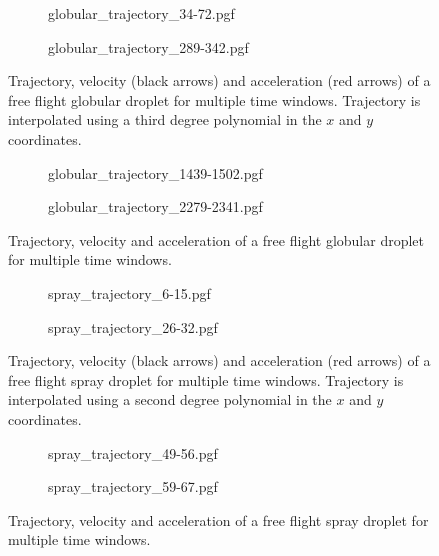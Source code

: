 \begin{figure}
\centering
  \begin{subfigure}[b]{.8\textwidth}
    {globular_trajectory_34-72.pgf}
  \end{subfigure}
\vfill
  \begin{subfigure}[b]{.8\textwidth}
    {globular_trajectory_289-342.pgf}
  \end{subfigure}
\caption[Trajectory, velocity and acceleration of a free flight globular droplet for multiple time windows]{Trajectory, velocity (black arrows) and acceleration (red arrows) of a free flight globular droplet for multiple time windows. Trajectory is interpolated using a third degree polynomial in the $x$ and $y$ coordinates.} 
\label{fig:vel_glob}
\end{figure}

\begin{figure}
\centering
    \ContinuedFloat
    \captionsetup{list=off,format=cont}
  \begin{subfigure}[b]{.8\textwidth}
    {globular_trajectory_1439-1502.pgf}
  \end{subfigure}
\vfill
  \begin{subfigure}[b]{.8\textwidth}
    {globular_trajectory_2279-2341.pgf}
  \end{subfigure}
\caption{Trajectory, velocity and acceleration of a free flight globular droplet for multiple time windows.} 
\end{figure}

\begin{figure}
\centering
  \begin{subfigure}[b]{.8\textwidth}
    {spray_trajectory_6-15.pgf}
  \end{subfigure}
\vfill
  \begin{subfigure}[b]{.8\textwidth}
    {spray_trajectory_26-32.pgf}
  \end{subfigure}
\caption[Trajectory, velocity and acceleration of a free flight spray droplet for multiple time windows]{Trajectory, velocity (black arrows) and acceleration (red arrows) of a free flight spray droplet for multiple time windows. Trajectory is interpolated using a second degree polynomial in the $x$ and $y$ coordinates.} 
\label{fig:vel_spray}
\end{figure}

\begin{figure}
\centering
    \ContinuedFloat
    \captionsetup{list=off,format=cont}
  \begin{subfigure}[b]{.8\textwidth}
    {spray_trajectory_49-56.pgf}
  \end{subfigure}
\vfill
  \begin{subfigure}[b]{.8\textwidth}
    {spray_trajectory_59-67.pgf}
  \end{subfigure}
\caption{Trajectory, velocity and acceleration of a free flight spray droplet for multiple time windows.} 
\end{figure}

